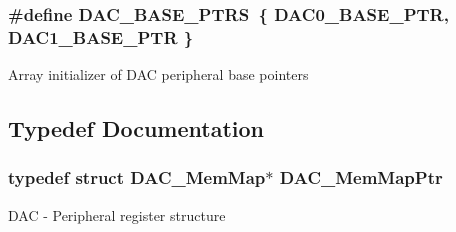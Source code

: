 \subsubsection[{D\+A\+C\+\_\+\+B\+A\+S\+E\+\_\+\+P\+T\+R\+S}]{\setlength{\rightskip}{0pt plus 5cm}\#define D\+A\+C\+\_\+\+B\+A\+S\+E\+\_\+\+P\+T\+R\+S~\{ {\bf D\+A\+C0\+\_\+\+B\+A\+S\+E\+\_\+\+P\+T\+R}, {\bf D\+A\+C1\+\_\+\+B\+A\+S\+E\+\_\+\+P\+T\+R} \}}\label{group___d_a_c___peripheral_gab47690040e4d63adc4f324358c27157a}
Array initializer of D\+A\+C peripheral base pointers 

\subsection{Typedef Documentation}
\hypertarget{group___d_a_c___peripheral_gaf4fffbe25ce148c577ec740897223a7f}{}
\subsubsection[{D\+A\+C\+\_\+\+Mem\+Map\+Ptr}]{\setlength{\rightskip}{0pt plus 5cm}typedef struct {\bf D\+A\+C\+\_\+\+Mem\+Map}$\ast$ {\bf D\+A\+C\+\_\+\+Mem\+Map\+Ptr}}\label{group___d_a_c___peripheral_gaf4fffbe25ce148c577ec740897223a7f}
D\+A\+C -\/ Peripheral register structure 
